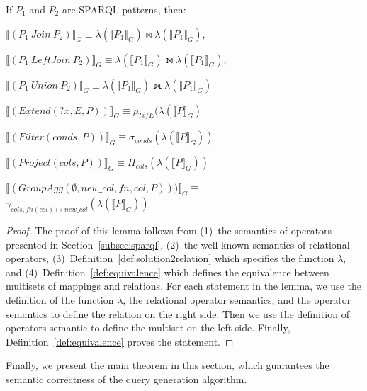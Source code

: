 \vspace*{-4pt}
\begin{lemma}
\label{lem:equivofoperations}
If $P_1$ and $P_2$ are SPARQL patterns, then:
\begin{packed_enum}
\item[a.]
$\llbracket(P_1\ Join\ P_2)\rrbracket_G \equiv \lambda(\llbracket P_1\rrbracket_G) \Join \lambda(\llbracket P_1\rrbracket_G)$,
\item[b.]$\llbracket(P_1\ LeftJoin \ P_2)\rrbracket_G \equiv \lambda(\llbracket P_1\rrbracket_G) \leftouterjoin \lambda(\llbracket P_1\rrbracket_G)$,
\item[c.]$\llbracket(P_1\ Union \ P_2)\rrbracket_G \equiv \lambda(\llbracket P_1\rrbracket_G) \fullouterjoin \lambda(\llbracket P_1\rrbracket_G)$
\item[d.]$\llbracket(Extend(?x, E, P))\rrbracket_G \equiv \rho_{?x/E}(\lambda(\llbracket P\rrbracket_G)$
\item[e.]
$\llbracket(Filter(conds, P))\rrbracket_G \equiv 
\sigma_{conds}(\lambda(\llbracket P\rrbracket_G))$
\item[f.]$\llbracket(Project(cols, P))\rrbracket_G \equiv 
\Pi_{cols}(\lambda(\llbracket P\rrbracket_G))$
\item[g.]$\llbracket(GroupAgg(\emptyset, new\_col, fn, col, P)))\rrbracket_G \equiv$\\ $\gamma_{cols, fn(col) \mapsto new\_col}(\lambda(\llbracket P\rrbracket_G))$
\end{packed_enum}
\end{lemma}

\begin{proof}
The proof of this lemma follows from
(1)~the semantics of \sparql operators presented in Section~\ref{subsec:sparql},
(2)~the well-known semantics of relational operators,
(3)~Definition~\ref{def:solution2relation} which specifies the function $\lambda$,
and
(4)~Definition~\ref{def:equivalence} which defines the equivalence between multisets of mappings and relations.
For each statement in the lemma, we use the definition of the function $\lambda$, the relational operator semantics, and the \sparql operator semantics to define the relation on the right side.
Then we use the definition of \sparql operators semantic to define the 
multiset on the left side. 
Finally,
Definition~\ref{def:equivalence} proves the statement.
\end{proof}




\vspace*{-4pt}
Finally, we present the main theorem in this section, which guarantees the semantic correctness of the \rdfframes query generation algorithm.

